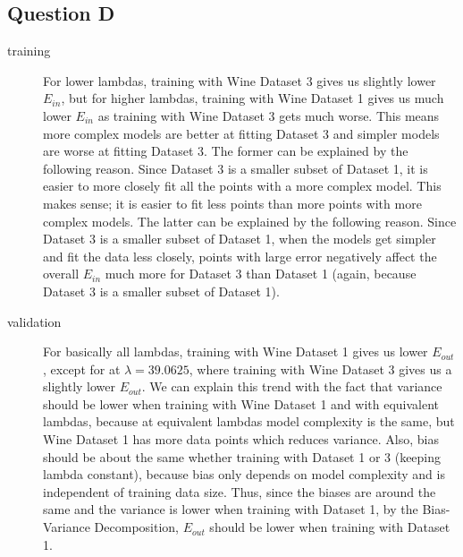\documentclass{article}
\begin{document}
\clearpage

\subsection*{Question D}
\begin{description}
    \item[training]
        For lower lambdas, training with Wine Dataset 3 gives us slightly
        lower $E_{in}$, but for higher lambdas, training with Wine Dataset 1 gives us
        much lower $E_{in}$ as training with Wine Dataset 3 gets much worse.
        This means more complex models are better at fitting Dataset 3 and
        simpler models are worse at fitting Dataset 3. The former can be explained
        by the following reason. Since Dataset 3 is a smaller subset of Dataset 1,
        it is easier to more closely fit all the points with a more complex model.
        This makes sense; it is easier to fit less points than more points with
        more complex models.
        The latter can be explained by the following reason. Since Dataset 3
        is a smaller subset of Dataset 1, when the models get simpler and fit
        the data less closely, points with large error negatively affect the
        overall $E_{in}$ much more for Dataset 3 than Dataset 1 (again, because
        Dataset 3 is a smaller subset of Dataset 1).
    \item[validation]
        For basically all lambdas, training with Wine Dataset 1 gives us lower
        $E_{out}$, except for at $\lambda = 39.0625$, where training with
        Wine Dataset 3 gives us a slightly lower $E_{out}$. We can explain this
        trend with the fact that variance should be lower when training with
        Wine Dataset 1 and with equivalent lambdas, because at equivalent
        lambdas model complexity is the same, but Wine Dataset 1 has more
        data points which reduces variance. Also, bias should be about the same
        whether training with Dataset 1 or 3 (keeping lambda constant),
        because bias only depends on model complexity and is independent of
        training data size. Thus, since the biases are around the same and
        the variance is lower when training with Dataset 1, by the
        Bias-Variance Decomposition, $E_{out}$ should be lower when training
        with Dataset 1.
\end{description}
\end{document}
